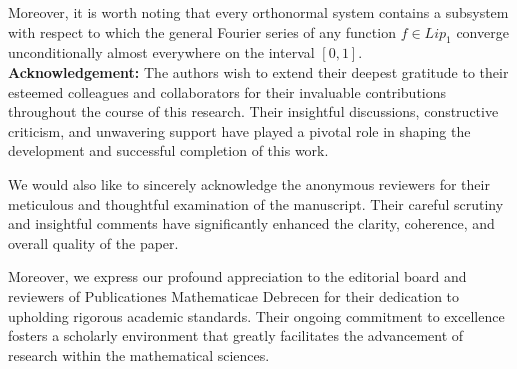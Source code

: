 \documentclass{publmathdeb}
\begin{document}
	Moreover, it is worth noting that every orthonormal system contains a subsystem with respect to which the general Fourier series of any function \(f \in Lip_1\) converge unconditionally almost everywhere on the interval \([0,1]\).\\
	
	
	\textbf{Acknowledgement:}
	The authors wish to extend their deepest gratitude to their esteemed colleagues and collaborators for their invaluable contributions throughout the course of this research. Their insightful discussions, constructive criticism, and unwavering support have played a pivotal role in shaping the development and successful completion of this work.
	
	We would also like to sincerely acknowledge the anonymous reviewers for their meticulous and thoughtful examination of the manuscript. Their careful scrutiny and insightful comments have significantly enhanced the clarity, coherence, and overall quality of the paper.
	
	Moreover, we express our profound appreciation to the editorial board and reviewers of Publicationes Mathematicae Debrecen for their dedication to upholding rigorous academic standards. Their ongoing commitment to excellence fosters a scholarly environment that greatly facilitates the advancement of research within the mathematical sciences.
	
\end{document}
